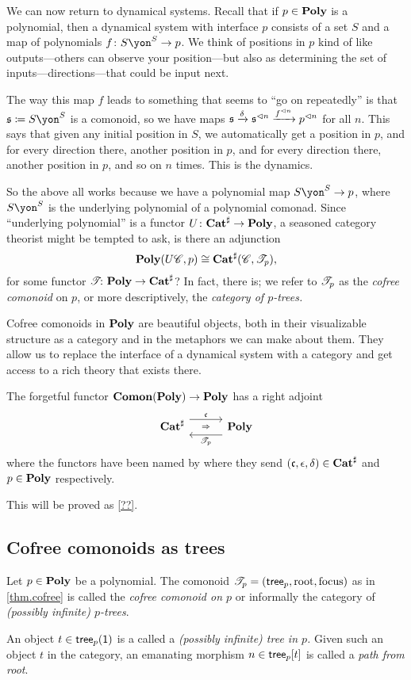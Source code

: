 \documentclass[Book-Poly]{subfiles}
\begin{document}
We can now return to dynamical systems. Recall that if $p\in\mathbf{Poly}$ is a polynomial, then a dynamical system with interface $p$ consists of a set $S$ and a map of polynomials $f\colon S\yon^S\to p$. We think of positions in $p$ kind of like outputs---others can observe your position---but also as determining the set of inputs---directions---that could be input next.

The way this map $f$ leads to something that seems to ``go on repeatedly'' is that $\ema{s}\coloneqq S\yon^S$ is a comonoid, so we have maps $\mathfrak{s}\xrightarrow{\delta}\mathfrak{s}^{\lhd n}\xrightarrow{f^{\lhd n}}p^{\lhd n}$ for all $n$. This says that given any initial position in $S$, we automatically get a position in $p$, and for every direction there, another position in $p$, and for every direction there, another position in $p$, and so on $n$ times. This is the dynamics.

So the above all works because we have a polynomial map $S\yon^S\to p$, where $S\yon^S$ is the underlying polynomial of a polynomial comonad. Since ``underlying polynomial'' is a functor $U\colon\mathbf{Cat}^\sharp\to\mathbf{Poly}$, a seasoned category theorist might be tempted to ask, is there an adjunction
\[
\mathbf{Poly}(U\mathscr{C},p)\cong\mathbf{Cat}^\sharp(\mathscr{C},\mathscr{T}_{p}),
\]
for some functor $\mathscr{T}_{}\colon\mathbf{Poly}\to\mathbf{Cat}^\sharp$? In fact, there is; we refer to $\mathscr{T}_{p}$ as the \emph{cofree comonoid} on $p$, or more descriptively, the \emph{category of $p$-trees.}

Cofree comonoids in $\mathbf{Poly}$ are beautiful objects, both in their visualizable structure as a category and in the metaphors we can make about them. They allow us to replace the interface of a dynamical system with a category and get access to a rich theory that exists there.

\begin{theorem}\label{thm.cofree}
The forgetful functor $\mathbf{Comon}(\mathbf{Poly})\to\mathbf{Poly}$ has a right adjoint
\[
  \adj{\smcat^\sharp}{\ema{c}}{\cofree{p}}{\poly}
\]
where the functors have been named by where they send $(\mathfrak{c},\epsilon,\delta)\in\mathbf{Cat}^\sharp$ and $p\in\mathbf{Poly}$ respectively.
\end{theorem}
This will be proved as \cref{??}.

\subsection{Cofree comonoids as trees}\label{subsec.cofree_tree}

\begin{definition}\label{def.cofree}
Let $p\in\mathbf{Poly}$ be a polynomial. The comonoid $\mathscr{T}_{p}=(\mathsf{tree}_p,\mathrm{root},\mathrm{focus})$ as in \cref{thm.cofree} is called the \emph{cofree comonoid on $p$} or informally the category of \emph{(possibly infinite) $p$-trees}.

An object $t\in \mathsf{tree}_p(\textsf{1})$ is a called a \emph{(possibly infinite) tree in $p$.} Given such an object $t$ in the category, an emanating morphism $n\in\mathsf{tree}_p[t]$ is called a \emph{path from root}.
\end{definition}
\end{document}
